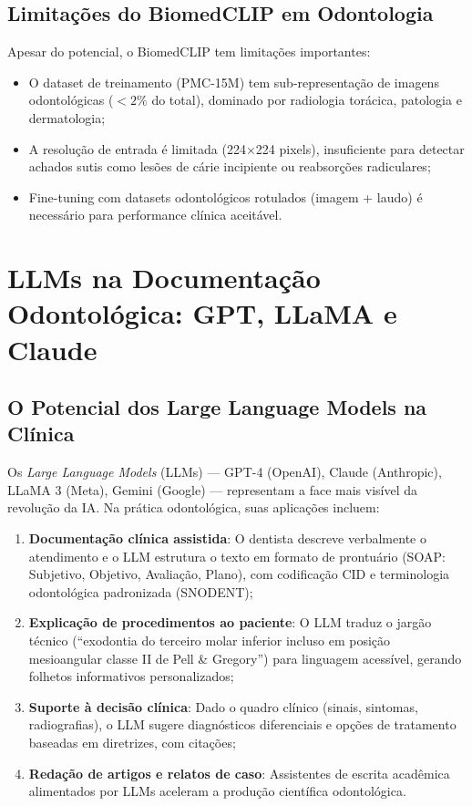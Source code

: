 \subsection{Limitações do BiomedCLIP em Odontologia}

Apesar do potencial, o BiomedCLIP tem limitações importantes:
\begin{itemize}
    \item O dataset de treinamento (PMC-15M) tem sub-representação de imagens odontológicas ($< 2\%$ do total), dominado por radiologia torácica, patologia e dermatologia;
    \item A resolução de entrada é limitada (224$\times$224 pixels), insuficiente para detectar achados sutis como lesões de cárie incipiente ou reabsorções radiculares;
    \item Fine-tuning com datasets odontológicos rotulados (imagem + laudo) é necessário para performance clínica aceitável.
\end{itemize}

\section{LLMs na Documentação Odontológica: GPT, LLaMA e Claude}

\subsection{O Potencial dos Large Language Models na Clínica}

Os \textit{Large Language Models} (LLMs) --- GPT-4 (OpenAI), Claude (Anthropic), LLaMA 3 (Meta), Gemini (Google) --- representam a face mais visível da revolução da IA. Na prática odontológica, suas aplicações incluem:

\begin{enumerate}
    \item \textbf{Documentação clínica assistida}: O dentista descreve verbalmente o atendimento e o LLM estrutura o texto em formato de prontuário (SOAP: Subjetivo, Objetivo, Avaliação, Plano), com codificação CID e terminologia odontológica padronizada (SNODENT);

    \item \textbf{Explicação de procedimentos ao paciente}: O LLM traduz o jargão técnico (``exodontia do terceiro molar inferior incluso em posição mesioangular classe II de Pell \& Gregory'') para linguagem acessível, gerando folhetos informativos personalizados;

    \item \textbf{Suporte à decisão clínica}: Dado o quadro clínico (sinais, sintomas, radiografias), o LLM sugere diagnósticos diferenciais e opções de tratamento baseadas em diretrizes, com citações;

    \item \textbf{Redação de artigos e relatos de caso}: Assistentes de escrita acadêmica alimentados por LLMs aceleram a produção científica odontológica.
\end{enumerate}

